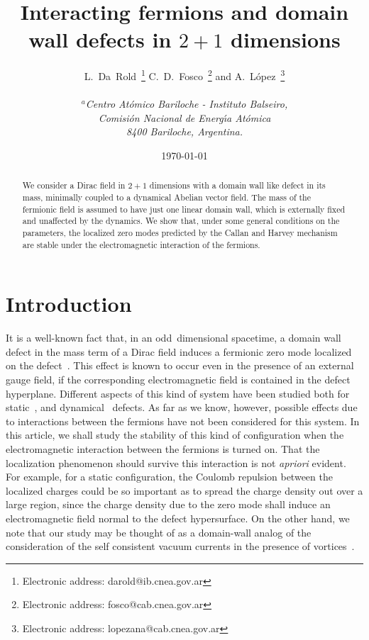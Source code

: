 \documentclass[a4paper,12pt]{article}
\begin{document}
\title{Interacting fermions and domain wall defects in $2+1$
  dimensions} \author{L.~Da~Rold~\footnote{Electronic address:
    darold@ib.cnea.gov.ar} C.~D.~Fosco~\footnote{Electronic address:
    fosco@cab.cnea.gov.ar} and A.~L{\'o}pez~\footnote{Electronic
    address: lopezana@cab.cnea.gov.ar}
  \\ \\
  {\normalsize\it $^a$Centro At\' omico Bariloche - Instituto Balseiro,}\\
  {\normalsize\it Comisi{\'o}n Nacional de Energ\'{\i}a At{\'o}mica}\\
  {\normalsize\it 8400 Bariloche, Argentina.}}  \date{\today}
\maketitle
\begin{abstract}
\noindent We consider a Dirac field in $2+1$ dimensions with a domain wall
like defect in its mass, minimally coupled to a dynamical Abelian
vector field.  The mass of the fermionic field is assumed to have just
one linear domain wall, which is externally fixed and unaffected by
the dynamics. We show that, under some general conditions on the
parameters, the localized zero modes predicted by the Callan and
Harvey mechanism are stable under the electromagnetic interaction of
the fermions.
\end{abstract}

\newpage
\section{Introduction}
It is a well-known fact that, in an odd~dimensional spacetime, a
domain wall defect in the mass term of a Dirac field induces a
fermionic zero mode localized on the defect~\cite{ch}.  This effect is
known to occur even in the presence of an external gauge field, if the
corresponding electromagnetic field is contained in the defect
hyperplane. Different aspects of this kind of system have been studied
both for static~\cite{p1,p2}, and dynamical~\cite{p3} defects. As far
as we know, however, possible effects due to interactions between the
fermions have not been considered for this system.  In this article,
we shall study the stability of this kind of configuration when the
electromagnetic interaction between the fermions is turned on.  That
the localization phenomenon should survive this interaction is not
{\em apriori\/} evident.  For example, for a static configuration, the
Coulomb repulsion between the localized charges could be so important
as to spread the charge density out over a large region, since the
charge density due to the zero mode shall induce an electromagnetic
field normal to the defect hypersurface.  On the other hand, we note
that our study may be thought of as a domain-wall analog of the
consideration of the self consistent vacuum currents in the presence
of vortices~\cite{li}. 
\end{document}
